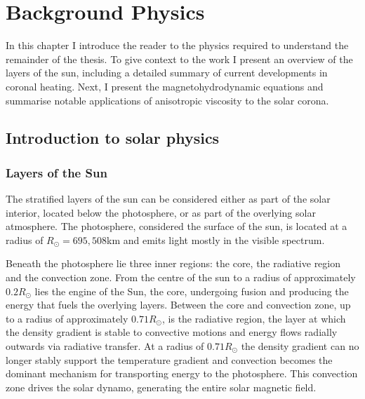 \chapter{Background Physics}
\label{chp:background}

\graphicspath{{images/background/}}

In this chapter I introduce the reader to the physics required to understand the remainder of the thesis. To give context to the work I present an overview of the layers of the sun, including a detailed summary of current developments in coronal heating. Next, I present the magnetohydrodynamic equations and summarise notable applications of anisotropic viscosity to the solar corona.

\section{Introduction to solar physics}

\subsection{Layers of the Sun}

The stratified layers of the sun can be considered either as part of the solar interior, located below the photosphere, or as part of the overlying solar atmosphere. The photosphere, considered the surface of the sun, is located at a radius of $R_{\odot} = 695,508$km and emits light mostly in the visible spectrum.

Beneath the photosphere lie three inner regions: the core, the radiative region and the convection zone. From the centre of the sun to a radius of approximately $0.2 R_{\odot}$ lies the engine of the Sun, the core, undergoing fusion and producing the energy that fuels the overlying layers. Between the core and convection zone, up to a radius of approximately  $0.71R_{\odot}$, is the radiative region, the layer at which the density gradient is stable to convective motions and energy flows radially outwards via radiative transfer. At a radius of $0.71R_{\odot}$ the density gradient can no longer stably support the temperature gradient and convection becomes the dominant mechanism for transporting energy to the photosphere. This convection zone drives the solar dynamo, generating the entire solar magnetic field.

